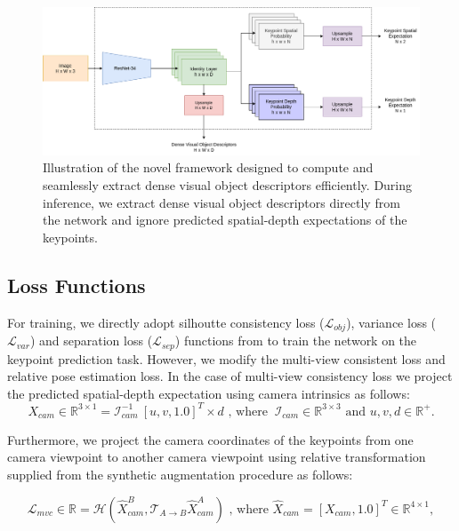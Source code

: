 \begin{figure}[htb]
    \centering
    \includegraphics[scale=0.325]{images/arch.png}
    \caption{Illustration of the novel framework designed to compute and seamlessly extract dense visual object descriptors efficiently.
        During inference, we extract dense visual object descriptors directly from the network and ignore predicted spatial-depth expectations of the keypoints.}
    \label{fig:modified_dnn}
\end{figure}


\subsection{Loss Functions}

For training, we directly adopt silhoutte consistency loss ($\mathcal{L}_{obj}$), variance loss ($\mathcal{L}_{var}$) and separation loss ($\mathcal{L}_{sep}$) functions from \cite{suwajanakorn2018discovery} to train the network on the keypoint prediction task.
However, we modify the multi-view consistent loss and relative pose estimation loss. In the case of multi-view consistency loss we
project the predicted spatial-depth expectation using camera intrinsics as follows:
\begin{equation}
    X_{cam} \in \mathbb{R}^{3 \times 1} = \mathcal{I}_{cam}^{-1}  \ [u, v, 1.0]^T \times d \text{ , where  } \ \mathcal{I}_{cam} \in \mathbb{R}^{3 \times 3} \text{ and }  u, v, d \in \mathbb{R}^+.
\end{equation}

Furthermore, we project the camera coordinates of the keypoints from one camera viewpoint to another camera viewpoint using relative transformation supplied from the synthetic augmentation procedure as follows:

\begin{equation}
    \label{eqn:mvc}
    \mathcal{L}_{mvc} \in \mathbb{R} = \mathcal{H}(\hat{X}^B_{cam}, \mathcal{T}_{A \rightarrow B} \hat{X}^A_{cam}) \text{ , where  } \hat{X}_{cam}=[X_{cam}, 1.0]^T \in \mathbb{R}^{4 \times 1} ,
\end{equation}


